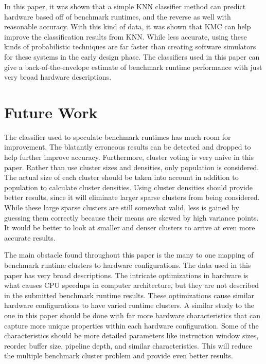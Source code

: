 \documentclass[10pt,twocolumn,letterpaper]{article}
\begin{document}
In this paper, it was shown that a simple KNN classifier method can predict hardware based off of benchmark runtimes, and the reverse as well with reasonable accuracy.
With this kind of data, it was shown that KMC can help improve the classification results from KNN.
While less accurate, using these kinds of probabilistic techniques are far faster than creating software simulators for these systems in the early design phase.
The classifiers used in this paper can give a back-of-the-envelope estimate of benchmark runtime performance with just very broad hardware descriptions.

\section{Future Work}

The classifier used to speculate benchmark runtimes has much room for improvement.
The blatantly erroneous results can be detected and dropped to help further improve accuracy.
Furthermore, cluster voting is very naive in this paper.
Rather than use cluster sizes and densities, only population is considered.
The actual size of each cluster should be taken into account in addition to population to calculate cluster densities.
Using cluster densities should provide better results, since it will eliminate larger sparse clusters from being considered.
While these large sparse clusters are still somewhat valid, less is gained by guessing them correctly because their means are skewed by high variance points.
It would be better to look at smaller and denser clusters to arrive at even more accurate results.

The main obstacle found throughout this paper is the many to one mapping of benchmark runtime clusters to hardware configurations.
The data used in this paper has very broad descriptions.
The intricate optimizations in hardware is what causes CPU speedups in computer architecture, but they are not described in the submitted benchmark runtime results.
These optimizations cause similar hardware configurations to have varied runtime clusters.
A similar study to the one in this paper should be done with far more hardware characteristics that can capture more unique properties within each hardware configuration.
Some of the characteristics should be more detailed parameters like instruction window sizes, reorder buffer size, pipeline depth, and  similar characteristics.
This will reduce the multiple benchmark cluster problem and provide even better results.
\end{document}
